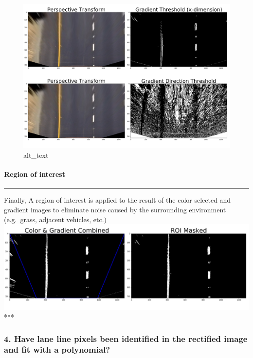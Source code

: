 \documentclass[11pt]{article}
\makeatletter
\def\maxwidth{\ifdim\Gin@nat@width>\linewidth\linewidth
    \else\Gin@nat@width\fi}
\let\Oldincludegraphics\includegraphics
\renewcommand{\includegraphics}[1]{\Oldincludegraphics[width=.8\maxwidth]{#1}}
\makeatother
\begin{document}
\begin{figure}
\centering
\includegraphics{./output_images/writeup_images/straight_lines1_gradient.png}
\caption{alt\_text}
\end{figure}

\hypertarget{region-of-interest}{%
\paragraph{Region of interest}\label{region-of-interest}}

\begin{center}\rule{0.5\linewidth}{\linethickness}\end{center}

Finally, A region of interest is applied to the result of the color
selected and gradient images to eliminate noise caused by the
surrounding environment (e.g.~grass, adjacent vehicles, etc.)
\includegraphics{./output_images/writeup_images/straight_lines1_roi.png}
***

    \hypertarget{have-lane-line-pixels-been-identified-in-the-rectified-image-and-fit-with-a-polynomial}{%
\subsubsection{4. Have lane line pixels been identified in the rectified
image and fit with a
polynomial?}\label{have-lane-line-pixels-been-identified-in-the-rectified-image-and-fit-with-a-polynomial}}
\end{document}
